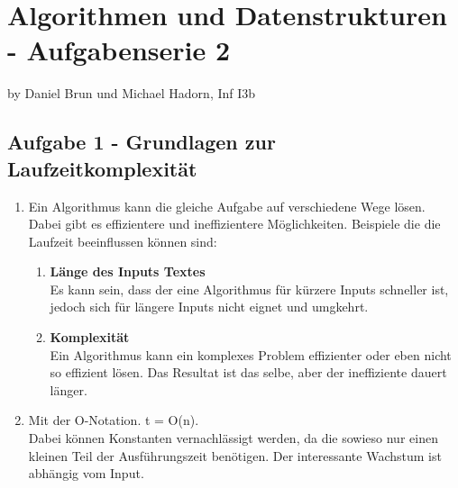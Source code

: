 \chapter*{Algorithmen und Datenstrukturen - Aufgabenserie 2}
\begin{flushright}
by Daniel Brun und Michael Hadorn, Inf I3b
\end{flushright}
\section*{Aufgabe 1 - Grundlagen zur Laufzeitkomplexität}
\begin{enumerate}
	\item %
	Ein Algorithmus kann die gleiche Aufgabe auf verschiedene Wege lösen. Dabei gibt es effizientere und ineffizientere Möglichkeiten.
	Beispiele die die Laufzeit beeinflussen können sind:
	\begin{enumerate}
		\item \textbf{Länge des Inputs Textes}\\
			Es kann sein, dass der eine Algorithmus für kürzere Inputs schneller ist, jedoch sich für längere Inputs nicht eignet und umgkehrt.
		
		\item \textbf{Komplexität}\\
			Ein Algorithmus kann ein komplexes Problem effizienter oder eben nicht so effizient lösen. Das Resultat ist das selbe, aber der ineffiziente dauert länger.
		
				
			
	\end{enumerate}
	
	\item %
	Mit der O-Notation. t = O(n).\\
	Dabei können Konstanten vernachlässigt werden, da die sowieso nur einen kleinen Teil der Ausführungszeit benötigen. Der interessante Wachstum ist abhängig vom Input.
	

\end{enumerate}
